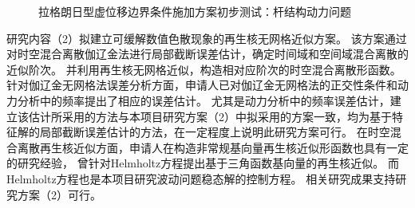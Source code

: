 \begin{figure}[!h]
    \centering 

    \caption{拉格朗日型虚位移边界条件施加方案初步测试：杆结构动力问题}
    \label{fg:bar}
\end{figure}

研究内容（2）拟建立可缓解数值色散现象的再生核无网格近似方案。
该方案通过对时空混合离散伽辽金法进行局部截断误差估计，确定时间域和空间域混合离散的近似阶次。
并利用再生核无网格近似，构造相对应阶次的时空混合离散形函数。
针对伽辽金无网格法误差分析方面，申请人已对伽辽金无网格法的正交性条件\cite{wu2021}和动力分析中的频率\cite{wu2018a}提出了相应的误差估计。
尤其是动力分析中的频率误差估计，建立该估计所采用的方法与本项目研究方案（2）中拟采用的方案一致，均为基于特征解的局部截断误差估计的方法，在一定程度上说明此研究方案可行。
在时空混合离散再生核近似方面，申请人在构造非常规基向量再生核近似形函数也具有一定的研究经验，
曾针对Helmholtz方程提出基于三角函数基向量的再生核近似\cite{wang2020b}。
而Helmholtz方程也是本项目研究波动问题稳态解的控制方程。
相关研究成果支持研究方案（2）可行。

